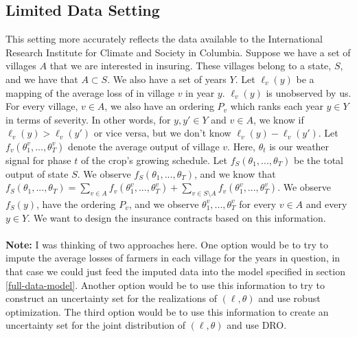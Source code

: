 \documentclass[11pt]{article}
\begin{document}
\subsection{Limited Data Setting}

This setting more accurately reflects the data available to the International Research Institute for Climate and Society in Columbia. Suppose we have a set of villages $A$ that we are interested in insuring. These villages belong to a state, $S$, and we have that $A \subset S$. We also have a set of years $Y$. Let $\ell_v(y)$ be a mapping of the average loss of in village $v$ in year $y$. $\ell_v(y)$ is unobserved by us. For every village, $v \in A$, we also have an ordering $P_v$ which ranks each year $y \in Y$ in terms of severity. In other words, for $y, y' \in Y$ and $v \in A$, we know if $\ell_v(y) > \ell_v(y')$ or vice versa, but we don't know $\ell_v(y) - \ell_v(y')$. Let $f_v(\theta^v_1,...,\theta^v_T)$ denote the average output of village $v$. Here, $\theta_t$ is our weather signal for phase $t$ of the crop's growing schedule. Let $f_S(\theta_1,...,\theta_T)$ be the total output of state $S$. We observe $f_S(\theta_1,...,\theta_T)$, and we know that $f_S(\theta_1,...,\theta_T) = \sum_{v\in A} f_v(\theta^v_1,...,\theta^v_T) + \sum_{v \in S \setminus A} f_v(\theta^v_1,...,\theta^v_T)$. We observe $f_S(y)$, have the ordering $P_v$, and we observe $\theta^v_1,...,\theta^v_T$ for every $v \in A$ and every $y \in Y$. We want to design the insurance contracts based on this information. \\ \\
\textbf{Note:} I was thinking of two approaches here. One option would be to try to impute the average losses of farmers in each village for the years in question, in that case we could just feed the imputed data into the model specified in section \ref{full-data-model}. Another option would be to use this information to try to construct an uncertainty set for the realizations of $(\ell,\theta)$ and use robust optimization. The third option would be to use this information to create an uncertainty set for the joint distribution of $(\ell,\theta)$ and use DRO. 
\end{document}
